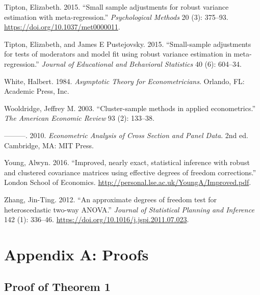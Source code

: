 \documentclass[12pt]{article}
\newlength{\cslhangindent}
\newlength{\cslentryspacingunit} %
\newenvironment{CSLReferences}[2] %
 {%
  \setlength{\parindent}{0pt}
  \ifodd #1
  \let\oldpar\par
  \def\par{\hangindent=\cslhangindent\oldpar}
  \fi
  \setlength{\parskip}{#2\cslentryspacingunit}
 }%
 {}
\begin{document}
\begin{CSLReferences}{1}{0}
\leavevmode{}%
Tipton, Elizabeth. 2015. {``{Small sample adjustments for robust
variance estimation with meta-regression.}''} \emph{Psychological
Methods} 20 (3): 375--93. \url{https://doi.org/10.1037/met0000011}.

\leavevmode{}%
Tipton, Elizabeth, and James E Pustejovsky. 2015. {``{Small-sample
adjustments for tests of moderators and model fit using robust variance
estimation in meta-regression}.''} \emph{Journal of Educational and
Behavioral Statistics} 40 (6): 604--34.

\leavevmode{}%
White, Halbert. 1984. \emph{Asymptotic Theory for Econometricians}.
Orlando, FL: Academic Press, Inc.

\leavevmode{}%
Wooldridge, Jeffrey M. 2003. {``{Cluster-sample methods in applied
econometrics}.''} \emph{The American Economic Review} 93 (2): 133--38.

\leavevmode{}%
---------. 2010. \emph{{Econometric Analysis of Cross Section and Panel
Data}}. 2nd ed. Cambridge, MA: MIT Press.

\leavevmode{}%
Young, Alwyn. 2016. {``{Improved, nearly exact, statistical inference
with robust and clustered covariance matrices using effective degrees of
freedom corrections}.''} London School of Economics.
\url{http://personal.lse.ac.uk/YoungA/Improved.pdf}.

\leavevmode{}%
Zhang, Jin-Ting. 2012. {``{An approximate degrees of freedom test for
heteroscedastic two-way ANOVA}.''} \emph{Journal of Statistical Planning
and Inference} 142 (1): 336--46.
\url{https://doi.org/10.1016/j.jspi.2011.07.023}.

\end{CSLReferences}

\newpage

\hypertarget{appendix-a-proofs}{%
\section{Appendix A: Proofs}\label{appendix-a-proofs}}

\hypertarget{proof-of-theorem-1}{%
\subsection{Proof of Theorem 1}\label{proof-of-theorem-1}}
\end{document}
